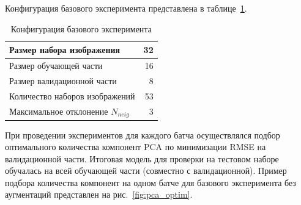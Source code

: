 \documentclass[a4paper,14pt]{article}
\begin{document}
    Конфигурация базового эксперимента представлена в таблице~\ref{tab:base_config}.
    \begin{center}
        \begin{table}[H]
            \centering
            \caption{Конфигурация базового эксперимента}
            \label{tab:base_config}
            \bgroup
            \def\arraystretch{1.5}
            \begin{tabular}{| l | r |}
                \hline
                Размер набора изображения         & 32 \\ \hline
                Размер обучающей части            & 16 \\ \hline
                Размер валидационной части        & 8  \\ \hline
                Количество наборов изображений    & 53 \\ \hline
                Максимальное отклонение  $N_{neig}$ & 3  \\
                \hline
            \end{tabular}
            \egroup
        \end{table}
    \end{center}

    При проведении экспериментов для каждого батча осуществлялся подбор оптимального количества компонент PCA по минимизации RMSE на валидационной части. Итоговая модель для проверки на тестовом наборе обучалась на всей обучающей части (совместно с валидационной).
    Пример подбора количества компонент на одном батче для базового эксперимента без аугментаций представлен на рис.~\ref{fig:pca_optim}.
\end{document}
